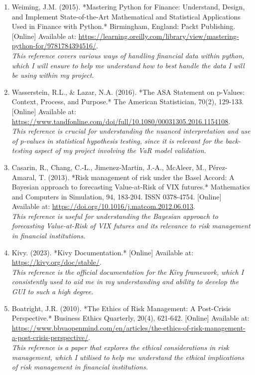 \documentclass{article}
\begin{document}
\begin{small}
\begin{enumerate}
  \item\label{ref10} Weiming, J.M. (2015). *Mastering Python for Finance: Understand, Design, and Implement State-of-the-Art Mathematical and Statistical Applications Used in Finance with Python.* Birmingham, England: Packt Publishing. [Online] Available at: \url{https://learning.oreilly.com/library/view/mastering-python-for/9781784394516/}.
  \\\textit{This reference covers various ways of handling financial data within python, which I will ensure to help me understand how to best handle the data I will be using within my project.}

  \item\label{ref11} Wasserstein, R.L., \& Lazar, N.A. (2016). *The ASA Statement on p-Values: Context, Process, and Purpose.* The American Statistician, 70(2), 129-133. [Online] Available at: \url{https://www.tandfonline.com/doi/full/10.1080/00031305.2016.1154108}.
  \\\textit{This reference is crucial for understanding the nuanced interpretation and use of p-values in statistical hypothesis testing, since it is  relevant for the back-testing aspect of my project involving the VaR model validation.}

  \item\label{ref12} Casarin, R., Chang, C.-L., Jimenez-Martin, J.-A., McAleer, M., Pérez-Amaral, T. (2013). *Risk management of risk under the Basel Accord: A Bayesian approach to forecasting Value-at-Risk of VIX futures.* Mathematics and Computers in Simulation, 94, 183-204. ISSN 0378-4754. [Online] Available at: \url{https://doi.org/10.1016/j.matcom.2012.06.013}.
  \\\textit{This reference is useful for understanding the Bayesian approach to forecasting Value-at-Risk of VIX futures and its relevance to risk management in financial institutions.}

  \item\label{ref13} Kivy. (2023). *Kivy Documentation.* [Online] Available at: \url{https://kivy.org/doc/stable/}.
  \\\textit{This reference is the official documentation for the Kivy framework, which I consistently used to aid me in my understanding and ability to develop the GUI to such a high degree.}
  
  \item\label{ref14} Boatright, J.R. (2010). *The Ethics of Risk Management: A Post-Crisis Perspective.* Business Ethics Quarterly, 20(4), 621-642. [Online] Available at: \url{https://www.bbvaopenmind.com/en/articles/the-ethics-of-risk-management-a-post-crisis-perspective/}.
  \\\textit{This reference is a paper that explores the ethical considerations in risk management, which I utilised to help me understand the ethical implications of risk management in financial institutions.}


\end{enumerate}
\end{small}
\end{document}
